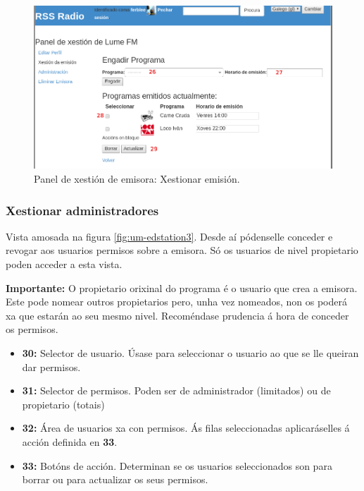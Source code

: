 \begin{figure}[h]
	\centering
	\includegraphics[scale=0.43,keepaspectratio=true]{./images/usermanual/um-edstation2.png}
	\caption{Panel de xestión de emisora: Xestionar emisión.}
	\label{fig:um-edstation2}
\end{figure}

\subsubsection{Xestionar administradores}

Vista amosada na figura \ref{fig:um-edstation3}. Desde aí pódenselle conceder e revogar aos usuarios permisos sobre a emisora. Só os usuarios de nivel propietario poden acceder a esta vista. 

\textbf{Importante:} O propietario orixinal do programa é o usuario que crea a emisora. Este pode nomear outros propietarios pero, unha vez nomeados, non os poderá  xa que estarán ao seu mesmo nivel. Recoméndase prudencia á hora de conceder os permisos.

\begin{itemize}
	\item \textbf{30:} Selector de usuario. Úsase para seleccionar o usuario ao que se lle queiran dar permisos.
	\item \textbf{31:} Selector de permisos. Poden ser de administrador (limitados) ou de propietario (totais)
	\item \textbf{32:} Área de usuarios xa con permisos. Ás filas seleccionadas aplicaráselles á acción definida en \textbf{33}.
	\item \textbf{33:} Botóns de acción. Determinan se os usuarios seleccionados son para borrar ou para actualizar os seus permisos.
\end{itemize}

